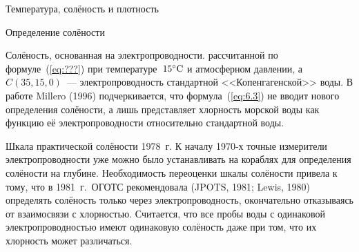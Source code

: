 \begin{chapter}{Температура, солёность и плотность}
\begin{section}{Определение солёности}
\begin{paragraph}{Солёность, основанная на электропроводности.}
рассчитанной по формуле~(\ref{eq:???}) при температуре~${15}^\circ\mbox{C}$ 
и атмосферном давлении, а~$C(35,15,0)$~--- электропроводность стандартной
<<Копенгагенской>> воды. В работе Millero (1996) подчеркивается, что 
формула~(\ref{eq:6.3}) не вводит нового определения солёности, а лишь
представляет хлорность морской воды как функцию её электропроводности
относительно стандартной воды.
%
\end{paragraph}

\begin{paragraph}{Шкала практической солёности 1978~г.}
К началу 1970-х точные измерители электропроводности уже можно было
устанавливать на кораблях для определения солёности на
глубине. Необходимость переоценки шкалы солёности привела к тому, что в
1981~г.\ ОГОТС рекомендовала (JPOTS, 1981; Lewis, 1980)
определять солёность только через электропроводность, окончательно 
отказываясь от взаимосвязи с хлорностью. Считается, что все пробы воды с
одинаковой электропроводностью имеют одинаковую солёность даже при том, что
их хлорность может различаться.
%


\end{paragraph}
\end{section}
\end{chapter}
